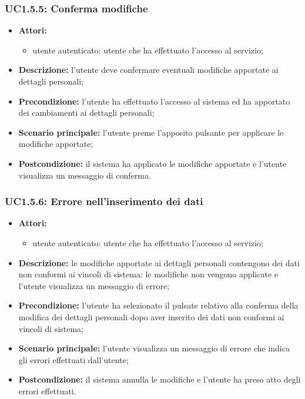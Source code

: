 \subsubsection{UC1.5.5:  Conferma modifiche}
\begin{itemize}
	\item \textbf{Attori:}
	\begin{itemize}
		\item utente autenticato: utente che ha effettuato l'accesso al servizio;
	\end{itemize}
	\item \textbf{Descrizione:} l'utente deve confermare eventuali modifiche apportate ai dettagli personali;
	\item \textbf{Precondizione:} l'utente ha effettuato l'accesso al sistema ed ha apportato dei cambiamenti ai dettagli personali;
	\item \textbf{Scenario principale:} l'utente preme l'apposito pulsante per applicare le modifiche apportate;
	\item \textbf{Postcondizione:} il sistema ha applicato le modifiche apportate e l'utente visualizza un messaggio di conferma.
\end{itemize}

\subsubsection{UC1.5.6:  Errore nell'inserimento dei dati}
\begin{itemize}
	\item \textbf{Attori:}
	\begin{itemize}
		\item utente autenticato: utente che ha effettuato l'accesso al servizio;
	\end{itemize}
	\item \textbf{Descrizione:} le modifiche apportate ai dettagli personali contengono dei dati non conformi ai vincoli di sistema: le modifiche non vengono applicate e l'utente visualizza un messaggio di errore;
	\item \textbf{Precondizione:} l'utente ha selezionato il pulsate relativo alla conferma della modifica dei dettagli personali dopo aver inserito dei dati non conformi ai vincoli di sistema;
	\item \textbf{Scenario principale:} l'utente visualizza un messaggio di errore che indica gli errori effettuati dall'utente;
	\item \textbf{Postcondizione:} il sistema annulla le modifiche e l'utente ha preso atto degli errori effettuati.
\end{itemize}


